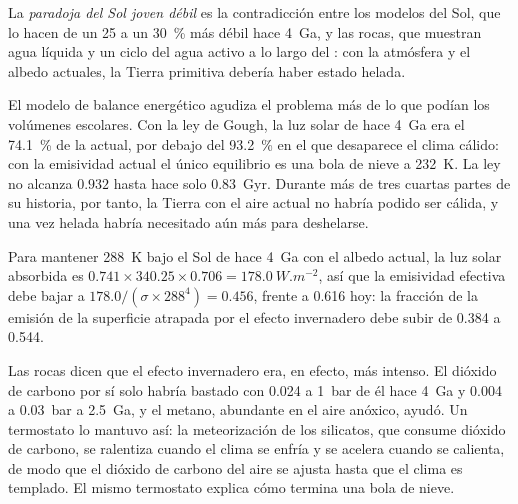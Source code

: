 \begin{definition}\label{def:b2:precambrian-earth:faint-sun}
La \emph{paradoja del Sol joven débil} es la contradicción entre
los modelos del Sol, que lo hacen de un 25 a un \qty{30}{\percent} más débil hace \qty{4}{Ga}, y las
rocas, que muestran agua líquida y un ciclo del agua activo a lo largo del : con la
atmósfera y el albedo actuales, la Tierra primitiva debería haber estado helada.
\end{definition}

El modelo de balance energético agudiza el problema más de lo que podían los volúmenes escolares. Con la ley de
Gough, la luz solar de hace \qty{4}{Ga} era el \qty{74.1}{\percent} de la actual, por debajo del
\qty{93.2}{\percent} en el que desaparece el clima cálido: con la emisividad actual el único
equilibrio es una bola de nieve a \qty{232}{K}. La ley no alcanza $0.932$ hasta hace solo
\qty{0.83}{Gyr}. Durante más de tres cuartas partes de su historia, por tanto, la Tierra con
el aire actual no habría podido ser cálida, y una vez helada habría necesitado aún más para deshelarse.

\begin{example}\label{ex:b2:precambrian-earth:young-greenhouse}
Para mantener \qty{288}{K} bajo el Sol de hace \qty{4}{Ga} con el albedo actual, la luz solar
absorbida es $0.741\times340.25\times0.706 = \qty{178.0}{W.m^{-2}}$, así que la emisividad efectiva
debe bajar a $178.0/(\sigma\times288^4) = 0.456$, frente a 0.616 hoy: la fracción de la
emisión de la superficie atrapada por el efecto invernadero debe subir de 0.384 a 0.544.
\end{example}

Las rocas dicen que el efecto invernadero era, en efecto, más intenso. El dióxido de carbono por sí solo habría bastado con
0.024 a \qty{1}{bar} de él hace \qty{4}{Ga} y 0.004 a \qty{0.03}{bar} a \qty{2.5}{Ga}, y el
metano, abundante en el aire anóxico, ayudó. Un termostato lo mantuvo así: la meteorización de los silicatos,
que consume dióxido de carbono, se ralentiza cuando el clima se enfría y se acelera cuando se calienta, de modo que el
dióxido de carbono del aire se ajusta hasta que el clima es templado. El mismo termostato explica
cómo termina una bola de nieve.

